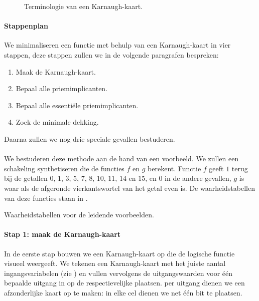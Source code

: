 \begin{figure}[hbt]
\centering
{}
\caption{Terminologie van een Karnaugh-kaart.}
\end{figure}

\paragraph{Stappenplan}
We minimaliseren een functie met behulp van een Karnaugh-kaart in vier stappen, deze stappen zullen we in de volgende paragrafen bespreken:
\begin{enumerate}
 \item Maak de Karnaugh-kaart.
 \item Bepaal alle priemimplicanten.
 \item Bepaal alle essenti\"ele priemimplicanten.
 \item Zoek de minimale dekking.
\end{enumerate}
Daarna zullen we nog drie speciale gevallen bestuderen.

\paragraph{}
We bestuderen deze methode aan de hand van een voorbeeld. We zullen een schakeling synthetiseren die de functies $f$ en $g$ berekent. Functie $f$ geeft $1$ terug bij de getallen $0$, $1$, $3$, $5$, $7$, $8$, $10$, $11$, $14$ en $15$, en $0$ in de andere gevallen, $g$ is waar als de afgeronde vierkantswortel van het getal even is. De waarheidstabellen van deze functies staan in .

\begin{table}
\centering
{}
\caption{Waarheidstabellen voor de leidende voorbeelden.}
\end{table}

\paragraph{Stap 1: maak de Karnaugh-kaart}
In de eerste stap bouwen we een Karnaugh-kaart op die de logische functie visueel weergeeft. We tekenen een Karnaugh-kaart met het juiste aantal ingangsvariabelen (zie ) en vullen vervolgens de uitgangswaarden voor \'e\'en bepaalde uitgang in op de respectievelijke plaatsen. per uitgang dienen we een afzonderlijke kaart op te maken: in elke cel dienen we net \'e\'en bit te plaatsen.

